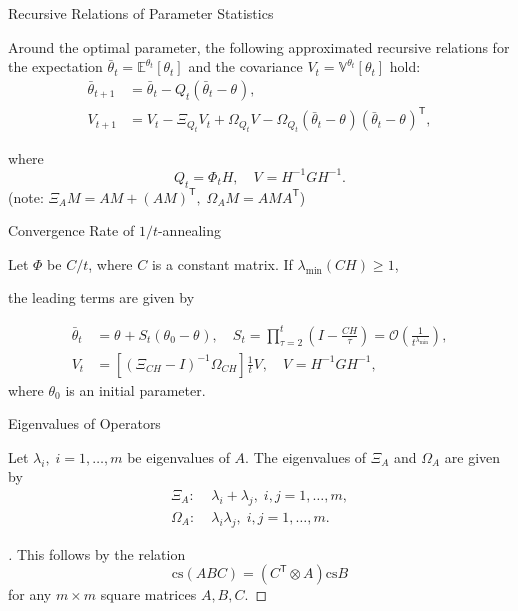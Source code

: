 \documentclass[fleqn,aspectratio=1610]{beamer}
\begin{document}
\begin{frame}[label={sec:org33879e3}]{Recursive Relations of Parameter Statistics}
\begin{lemma}[]\label{sec:orgcbd8df0}
Around the optimal parameter,
the following approximated recursive relations for
the expectation \(\bar\theta_{t}=\mathbb{E}^{\theta_{t}}\left[\theta_{t}\right]\)
and the covariance \(V_{t}=\mathbb{V}^{\theta_{t}}\left[\theta_{t}\right]\)
hold:
\begin{align}
  \bar{\theta}_{t+1}
  &=\bar{\theta}_{t}
    -Q_{t}(\bar{\theta}_{t}-\theta_{}),\\
  V_{t+1}
  &=V_{t}
    -\Xi_{Q_{t}}V_{t}
    +\Omega_{Q_{t}}V_{}
    -\Omega_{Q_{t}}(\bar{\theta}_{t}-\theta_{}) 
    (\bar{\theta}_{t}-\theta_{})^{\mathsf{T}},
\end{align}

where
\begin{equation}
  Q_{t}=\varPhi_{t}H,\quad
  V_{}=H^{-1}GH^{-1}.
\end{equation}
(note: \(\Xi_{A}M= AM+(AM)^{\mathsf{T}},\;\Omega_{A}M= AMA^{\mathsf{T}}\))
\end{lemma}
\end{frame}

\begin{frame}[label={sec:orgd225890}]{Convergence Rate of \(1/t\)-annealing}
\begin{theorem}[]\label{sec:org3e3bb8f}
Let \(\varPhi\) be \(C/t\), where \(C\) is a constant matrix.
If \(\lambda_{\min}(CH)\geq 1\), 

the leading terms are given by

\begin{align}
  \bar\theta_{t}
  &=\theta_{}+S_{t}(\theta_{0}-\theta_{}),
    \quad
    S_{t}
    =\prod_{\tau=2}^{t}\left(I-\frac{CH}{\tau}\right)
    =\mathcal{O}\left(\frac{1}{t^{\lambda_{\min}}}\right),\\
  V_{t}
  &=\left[\left(\Xi_{CH}-I\right)^{-1}\Omega_{CH}\right]\frac{1}{t}V_{},
    \quad V_{}=H^{-1}GH^{-1},
\end{align}
where \(\theta_{0}\) is an initial parameter.
\end{theorem}
\end{frame}

\begin{frame}[label={sec:orge3a3a43}]{Eigenvalues of Operators}
\begin{lemma}[]\label{sec:orgce64c94}
Let \(\lambda_{i},\;i=1,\dotsc,m\) be eigenvalues of \(A\).
The eigenvalues of \(\Xi_{A}\) and \(\Omega_{A}\) are given by
\begin{align}
  \Xi_{A}:\;&\lambda_{i}+\lambda_{j},\;i,j=1,\dotsc,m,\\
  \Omega_{A}:\;&\lambda_{i}\lambda_{j},\;i,j=1,\dotsc,m.
\end{align}
\end{lemma}
\begin{proof}[]
This follows by the relation
\begin{equation}
  \mathrm{cs}(ABC)=(C^{\mathsf{T}}\otimes A)\mathrm{cs} B
\end{equation}
for any \(m\times m\) square matrices \(A,B,C\).
\end{proof}
\end{frame}
\end{document}
